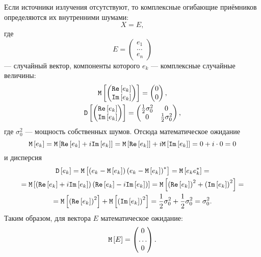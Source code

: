 Если источники излучения отсутствуют, то комплексные огибающие приёмников определяются их внутренними шумами:
\[
    X = E,
\]
где
\[
    E =
    \begin{pmatrix}
        e_1   \\
        \dots \\
        e_n
    \end{pmatrix}
\]
--- случайный вектор, компоненты которого $e_k$ --- комплексные случайные величины:
\begin{gather*}
    \mathtt{M} \left [ 
        \begin{pmatrix}
            \mathtt{Re} \left [ e_k \right ] \\ \mathtt{Im} \left [ e_k \right ]
        \end{pmatrix}
     \right ] =
    \begin{pmatrix}
        0 \\
        0
    \end{pmatrix} , \\
    \mathtt{D} \left [ 
        \begin{pmatrix}
            \mathtt{Re} \left [ e_k \right ] \\ \mathtt{Im} \left [ e_k \right ]
        \end{pmatrix}
     \right ] =
    \begin{pmatrix}
        \frac{1}{2} \sigma_0^2 & 0                      \\
        0                      & \frac{1}{2} \sigma_0^2
    \end{pmatrix} ,
\end{gather*}
где $\sigma_0^2$ --- мощность собственных шумов. Отсюда математическое ожидание
\[
    \mathtt{M} \left [ e_k \right ]
    = \mathtt{M} \left [ \mathtt{Re} \left [ e_k \right ] + i \mathtt{Im} \left [ e_k \right ] \right ]
    = \mathtt{M} \left [ \mathtt{Re} \left [ e_k \right ] \right ] + i \mathtt{M} \left [ \mathtt{Im} \left [ e_k \right ] \right ]
    = 0 + i \cdot 0
    = 0
\]
и дисперсия
\begin{multline*}
    \mathtt{D} \left [ e_k \right ]
    = \mathtt{M} \left [ \left( e_k - \mathtt{M} \left [ e_k \right ] \right) \left( e_k - \mathtt{M} \left [ e_k \right ] \right)^* \right ]
    = \mathtt{M} \left [ e_k e_k^* \right ] = \\
    = \mathtt{M} \left [ \left( \mathtt{Re} \left [ e_k \right ] + i \mathtt{Im} \left [ e_k \right ] \right) \left( \mathtt{Re} \left [ e_k \right ] - i \mathtt{Im} \left [ e_k \right ] \right) \right ]
    = \mathtt{M} \left [ \left( \mathtt{Re} \left [ e_k \right ] \right)^2 + \left( \mathtt{Im} \left [ e_k \right ] \right)^2 \right ] = \\
    = \mathtt{M} \left [ \left( \mathtt{Re} \left [ e_k \right ] \right)^2 \right ] + \mathtt{M} \left [ \left( \mathtt{Im} \left [ e_k \right ] \right)^2 \right ]
    = \frac{1}{2} \sigma_0^2 + \frac{1}{2} \sigma_0^2
    = \sigma_0^2 .
\end{multline*}
Таким образом, для вектора $E$ математическое ожидание:
\[
    \mathtt{M} \left [ E \right ]
    = \begin{pmatrix}
          0     \\
          \dots \\
          0
    \end{pmatrix} .
\]
